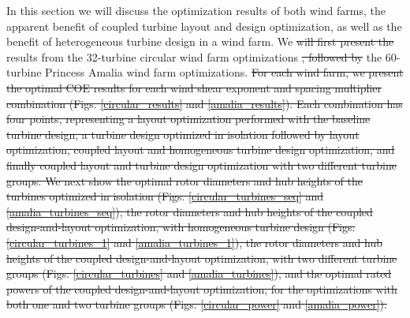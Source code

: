 \documentclass[wes, manuscript]{copernicus}
\providecommand{\DIFadd}[1]{{\protect\color{blue}\uwave{#1}}} %
\providecommand{\DIFdel}[1]{{\protect\color{red}\sout{#1}}}                      %
\providecommand{\DIFaddbegin}{} %
\providecommand{\DIFaddend}{} %
\providecommand{\DIFdelbegin}{} %
\providecommand{\DIFdelend}{} %
\begin{document}
In this section we will discuss the optimization results of both wind farms, the apparent benefit of coupled turbine layout and design optimization, as well as the benefit of heterogeneous turbine design in a wind farm.
We \DIFdelbegin \DIFdel{will first present the }\DIFdelend \DIFaddbegin \DIFadd{first present }\DIFaddend results from the 32-turbine circular wind farm optimizations \DIFdelbegin \DIFdel{, followed by }\DIFdelend \DIFaddbegin \DIFadd{and then compare to }\DIFaddend the 60-turbine Princess Amalia wind farm optimizations. 
\DIFdelbegin \DIFdel{For each wind farm, we present the optimal COE results for each wind shear exponent and spacing multiplier combination (Figs. \ref{circular_results} and \ref{amalia_results}). Each combination has four points, representing a layout optimization performed with the baseline turbine design, a turbine design optimized in isolation followed by layout optimization, coupled layout and homogeneous turbine design optimization, and finally coupled layout and turbine design optimization with two different turbine groups. 
We next show the optimal rotor diameters and hub heights of the turbines optimized in isolation (Figs. \ref{circular_turbines_seq} and \ref{amalia_turbines_seq}), the rotor diameters and hub heights of the coupled design-and-layout optimization, with homogeneous turbine design (Figs. \ref{circular_turbines_1} and \ref{amalia_turbines_1}), the rotor diameters and hub heights of the coupled design-and-layout optimization, with two different turbine groups (Figs. \ref{circular_turbines} and \ref{amalia_turbines}), and the optimal rated powers of the coupled design-and-layout optimization, for the optimizations with both one and two turbine groups (Figs. \ref{circular_power} and \ref{amalia_power}).
}\DIFdelend %
\end{document}
